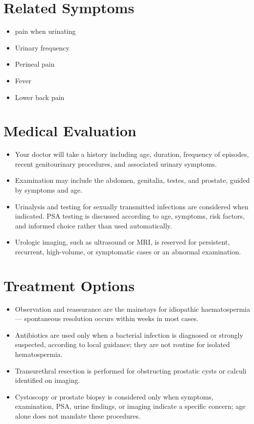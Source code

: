 \section*{Related Symptoms}
\begin{itemize}
 \item pain when urinating
 \item Urinary frequency
 \item Perineal pain
 \item Fever
 \item Lower back pain
\end{itemize}

\section*{Medical Evaluation}
\begin{itemize}
 \item Your doctor will take a history including age, duration, frequency of episodes, recent genitourinary procedures, and associated urinary symptoms.
 \item Examination may include the abdomen, genitalia, testes, and prostate, guided by symptoms and age.
 \item Urinalysis and testing for sexually transmitted infections are considered when indicated. PSA testing is discussed according to age, symptoms, risk factors, and informed choice rather than used automatically.
 \item Urologic imaging, such as ultrasound or MRI, is reserved for persistent, recurrent, high-volume, or symptomatic cases or an abnormal examination.
\end{itemize}

\section*{Treatment Options}
\begin{itemize}
 \item Observation and reassurance are the mainstays for idiopathic haematospermia — spontaneous resolution occurs within weeks in most cases.
 \item Antibiotics are used only when a bacterial infection is diagnosed or strongly suspected, according to local guidance; they are not routine for isolated hematospermia.
 \item Transurethral resection is performed for obstructing prostatic cysts or calculi identified on imaging.
 \item Cystoscopy or prostate biopsy is considered only when symptoms, examination, PSA, urine findings, or imaging indicate a specific concern; age alone does not mandate these procedures.
\end{itemize}


